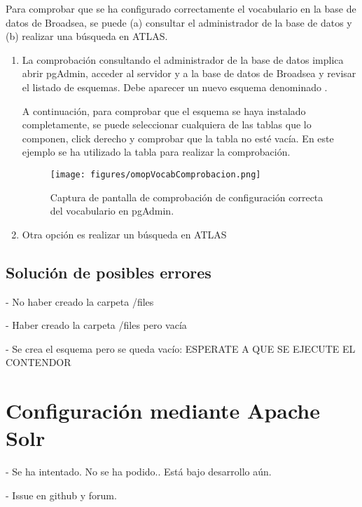 Para comprobar que se ha configurado correctamente el vocabulario en la base de datos de Broadsea, se puede (a) consultar el administrador de la base de datos y (b) realizar una búsqueda en ATLAS.

\begin{enumerate}

    \item La comprobación consultando el administrador de la base de datos implica abrir pgAdmin, acceder al servidor y a la base de datos de Broadsea y revisar el listado de esquemas. Debe aparecer un nuevo esquema denominado .
    
    A continuación, para comprobar que el esquema se haya instalado completamente, se puede seleccionar cualquiera de las tablas que lo componen, click derecho  y comprobar que la tabla no esté vacía. En este ejemplo se ha utilizado la tabla  para realizar la comprobación.

 \begin{figure}[H]
        \centering
        \texttt{[image: figures/omopVocabComprobacion.png]}
        \caption{Captura de pantalla de comprobación de configuración correcta del vocabulario en pgAdmin.}
        \label{fig:omopVocabComprobacion}
\end{figure}

    \item Otra opción es realizar un búsqueda en ATLAS
    
\end{enumerate}

\subsection{Solución de posibles errores}

- No haber creado la carpeta /files

- Haber creado la carpeta /files pero vacía

- Se crea el esquema pero se queda vacío: ESPERATE A QUE SE EJECUTE EL CONTENDOR 

\section{Configuración mediante Apache Solr}

- Se ha intentado. No se ha podido.. Está bajo desarrollo aún.

- Issue en github y forum.

